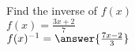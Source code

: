 \documentclass{ximera}
\author{David Kish}
\begin{document}
\begin{exercise}
Find the inverse of $f(x)$\\
$f(x)= \frac{3x+2}{7}$\\
$f(x)^{-1}=\answer{\frac{7x-2}{3}}$\\
\end{exercise}
\end{document}
